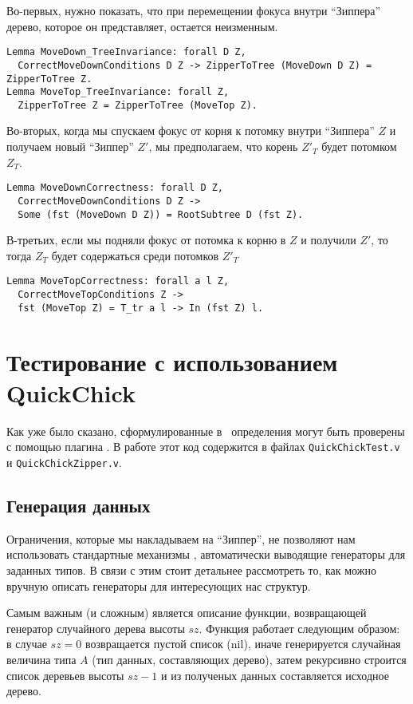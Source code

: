 Во-первых, нужно показать, что при перемещении фокуса внутри ``Зиппера'' дерево, которое он представляет, остается неизменным.

\begin{lstlisting}
Lemma MoveDown_TreeInvariance: forall D Z,
  CorrectMoveDownConditions D Z -> ZipperToTree (MoveDown D Z) = ZipperToTree Z.
Lemma MoveTop_TreeInvariance: forall Z,
  ZipperToTree Z = ZipperToTree (MoveTop Z).
\end{lstlisting}

Во-вторых, когда мы спускаем фокус от корня к потомку внутри ``Зиппера'' $Z$ и получаем новый ``Зиппер'' $Z'$, мы предполагаем, что корень $Z'_T$ будет потомком $Z_T$.  
\begin{lstlisting}
Lemma MoveDownCorrectness: forall D Z,
  CorrectMoveDownConditions D Z ->
  Some (fst (MoveDown D Z)) = RootSubtree D (fst Z).
\end{lstlisting}

В-третьих, если мы подняли фокус от потомка к корню в $Z$ и получили $Z'$, то тогда $Z_T$ будет содержаться среди потомков $Z'_T$
\begin{lstlisting}
Lemma MoveTopCorrectness: forall a l Z,
  CorrectMoveTopConditions Z ->
  fst (MoveTop Z) = T_tr a l -> In (fst Z) l.
\end{lstlisting}

\section{Тестирование с использованием QuickChick}

Как уже было сказано, сформулированные в \tcoq~определения могут быть проверены с помощью плагина \tqc. В работе этот код содержится в файлах \texttt{QuickChickTest.v} и \texttt{QuickChickZipper.v}.

\subsection{Генерация данных}

Ограничения, которые мы накладываем на ``Зиппер'', не позволяют нам использовать стандартные механизмы \tqc, автоматически выводящие генераторы для заданных типов. В связи с этим стоит детальнее рассмотреть то, как можно вручную описать генераторы для интересующих нас структур.

Самым важным (и сложным) является описание функции, возвращающей генератор случайного дерева высоты $sz$. Функция работает следующим образом: в случае $sz  = 0$ возвращается пустой список (nil), иначе генерируется случайная величина типа $A$ (тип данных, составляющих дерево), затем рекурсивно строится список деревьев высоты $sz - 1$ и из полученых данных составляется исходное дерево.

